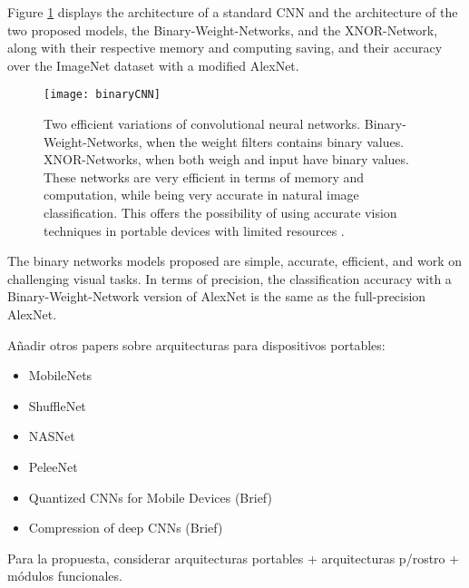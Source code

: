 Figure \ref{fig:binaryCNN} displays the architecture of a standard CNN and
the architecture of the two proposed models, the Binary-Weight-Networks,
and the XNOR-Network, along with their respective memory and computing
saving, and their accuracy over the ImageNet dataset with a modified AlexNet.

\begin{figure}[!h]
	\centering
	\texttt{[image: binaryCNN]}
	\caption[XOR-Net]
	{Two efficient variations of convolutional neural networks.
  Binary-Weight-Networks, when the weight filters contains binary values.
  XNOR-Networks, when both weigh and input have binary values. These
  networks are very efficient in terms of memory and computation, while
  being very accurate in natural image classification. This offers the
  possibility of using accurate vision techniques in portable devices
  with limited resources \citep{Rastegari2016}.}
  \label{fig:binaryCNN}
\end{figure}

The binary networks models proposed are simple, accurate, efficient, and
work on challenging visual tasks. In terms of precision, the classification
accuracy with a Binary-Weight-Network version of AlexNet is the same as the
full-precision AlexNet.

{\color{JungleGreen}
Añadir otros papers sobre arquitecturas para dispositivos portables:
\begin{itemize}
  \item MobileNets
  \item ShuffleNet
  \item NASNet
  \item PeleeNet
  \item Quantized CNNs for Mobile Devices {\color{blue}(Brief)} {\color{black}\citep{Wu2016}}
  \item Compression of deep CNNs {\color{blue}(Brief)} {\color{black}\citep{Kim2015}}
\end{itemize}
}

{\color{red}
Para la propuesta, considerar arquitecturas portables + arquitecturas
p/rostro + módulos funcionales.
}
